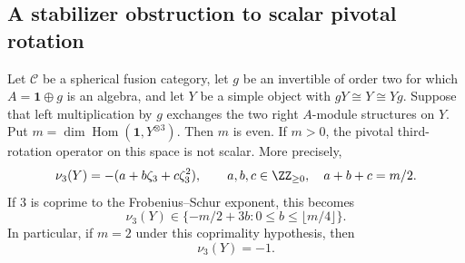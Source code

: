 \subsection{A stabilizer obstruction to scalar pivotal rotation}
\label{sec:stabilizer-rotation}

\begin{proposition}
\label{prop:stabilizer-rotation}
Let $\mathcal C$ be a spherical fusion category, let $g$ be an invertible
of order two for which $A=\mathbf1\oplus g$ is an algebra, and let $Y$
be a simple object with $gY\cong Y\cong Yg$. Suppose that left
multiplication by $g$ exchanges the two right $A$-module structures
on $Y$. Put $m=\dim\operatorname{Hom}(\mathbf1,Y^{\otimes3})$.
Then $m$ is even. If $m>0$, the pivotal third-rotation operator on this
space is not scalar. More precisely,
\[
 \nu_3(Y)=-(a+b\zeta_3+c\zeta_3^2),
 \qquad a,b,c\in\ZZ_{\ge0},\quad a+b+c=m/2.
\]
If $3$ is coprime to the Frobenius--Schur exponent, this becomes
\[
 \nu_3(Y)\in
 \{-m/2+3b:0\le b\le\lfloor m/4\rfloor\}.
\]
In particular, if $m=2$ under this coprimality hypothesis, then
\[
 \nu_3(Y)=-1.
\]
\end{proposition}
